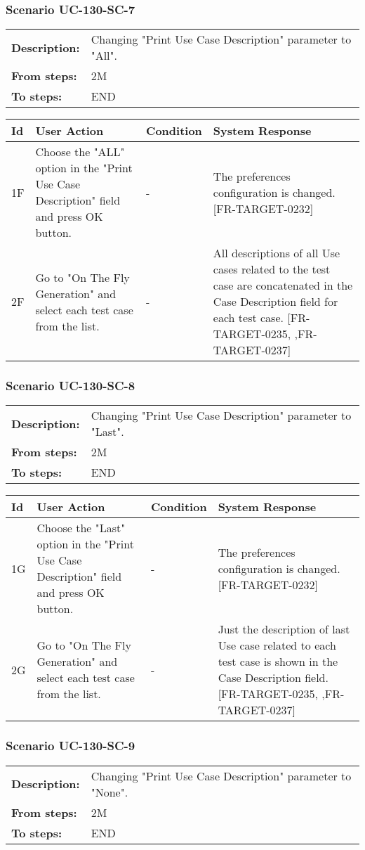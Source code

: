 \documentclass[a4paper,11pt]{article}
\newcommand{\bl}{\\ \hline}
\begin{document}
\subsubsection*{Scenario UC-130-SC-7}
\begin{tabular}{p{1in}p{4in}}
{\bf Description:} & Changing "Print Use Case Description" parameter to "All". \\
{\bf From steps:} & 2M \\
{\bf To steps:} & END \\
\end{tabular}
 
\begin{tabular}{|p{0.8in}|p{1.6in}|p{1.6in}|p{1.6in}|}
\hline
Id & User Action & Condition & System Response  \bl 
1F & Choose the "ALL" option in the "Print Use Case Description" field and press OK button. & - & The preferences configuration is changed. [FR-TARGET-0232] \bl 
2F & Go to "On The Fly Generation" and select each test case from the list. & - & All descriptions of all Use cases related to the test case are concatenated in the Case Description field for each test case. [FR-TARGET-0235, ,FR-TARGET-0237] \bl 
\end{tabular}
\subsubsection*{Scenario UC-130-SC-8}
\begin{tabular}{p{1in}p{4in}}
{\bf Description:} & Changing "Print Use Case Description" parameter to "Last". \\
{\bf From steps:} & 2M \\
{\bf To steps:} & END \\
\end{tabular}
 
\begin{tabular}{|p{0.8in}|p{1.6in}|p{1.6in}|p{1.6in}|}
\hline
Id & User Action & Condition & System Response  \bl 
1G & Choose the  "Last" option in the "Print Use Case Description" field and press OK button. & - & The preferences configuration is changed. [FR-TARGET-0232] \bl 
2G & Go to "On The Fly Generation" and select each test case from the list. & - & Just the description of last Use case related to each test case is shown in the Case Description field. [FR-TARGET-0235, ,FR-TARGET-0237] \bl 
\end{tabular}
\subsubsection*{Scenario UC-130-SC-9}
\begin{tabular}{p{1in}p{4in}}
{\bf Description:} & Changing "Print Use Case Description" parameter to "None". \\
{\bf From steps:} & 2M \\
{\bf To steps:} & END \\
\end{tabular}
 
\end{document}
